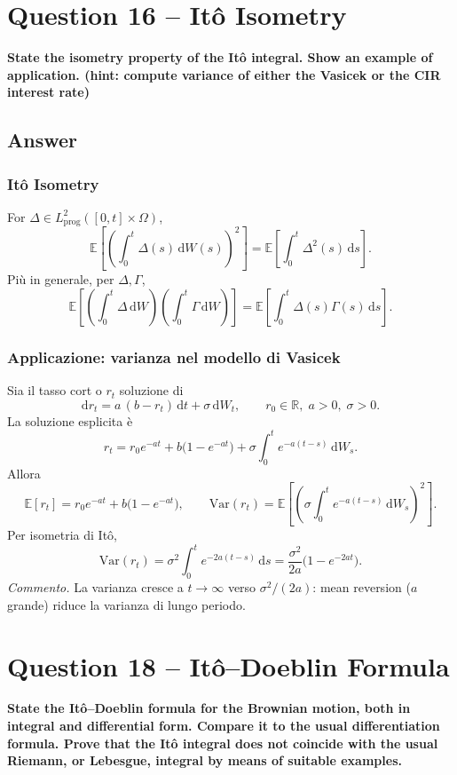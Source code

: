 \documentclass[12pt,a4paper]{book}
\theoremstyle{remark}
\newcommand{\EE}{\mathbb{E}}          %
\newcommand{\RR}{\mathbb{R}}
\newcommand{\Var}{\mathrm{Var}}       %
\newcommand{\dd}{\mathrm{d}}
\begin{document}
\newpage
\section{Question 16 -- Itô Isometry}
\textbf{State the isometry property of the It\^o integral. Show an example of application. (hint: compute variance of either the Vasicek or the CIR interest rate)}

\subsection*{Answer}

\subsubsection*{It\^o Isometry}
For $\Delta \in L^2_{\text{prog}}([0,t]\times\Omega)$,
\[
\boxed{\;\EE\!\left[\left(\int_0^t \Delta(s)\,\dd W(s)\right)^{\!2}\right]
= \EE\!\left[\int_0^t \Delta^2(s)\,\dd s\right].\;}
\]
Pi\`u in generale, per $\Delta,\Gamma$,
\[
\EE\!\left[\!\left(\int_0^t \Delta\,\dd W\right)\!\!\left(\int_0^t \Gamma\,\dd W\right)\!\right]
= \EE\!\left[\int_0^t \Delta(s)\Gamma(s)\,\dd s\right].
\]

\subsubsection*{Applicazione: varianza nel modello di Vasicek}
Sia il tasso cort o $r_t$ soluzione di
\[
\dd r_t = a\,(b-r_t)\,\dd t + \sigma\,\dd W_t,\qquad r_0 \in\RR,\; a>0,\; \sigma>0.
\]
La soluzione esplicita \`e
\[
r_t = r_0 e^{-at} + b\big(1-e^{-at}\big) + \sigma \int_0^t e^{-a(t-s)}\,\dd W_s.
\]
Allora
\[
\EE[r_t] = r_0 e^{-at} + b\big(1-e^{-at}\big),
\qquad
\Var(r_t) = \EE\!\left[\left(\sigma \int_0^t e^{-a(t-s)}\,\dd W_s\right)^{\!2}\right].
\]
Per isometria di It\^o,
\[
\Var(r_t) = \sigma^2 \int_0^t e^{-2a(t-s)}\,\dd s
= \frac{\sigma^2}{2a}\Big(1-e^{-2at}\Big).
\]
\textit{Commento.} La varianza cresce a $t\!\to\!\infty$ verso $\sigma^2/(2a)$: mean reversion ($a$ grande) riduce la varianza di lungo periodo.


\newpage
\section{Question 18 -- Itô--Doeblin Formula}
\textbf{State the It\^o--Doeblin formula for the Brownian motion, both in integral and differential form. Compare it to the usual differentiation formula. Prove that the It\^o integral does not coincide with the usual Riemann, or Lebesgue, integral by means of suitable examples.}
\end{document}
